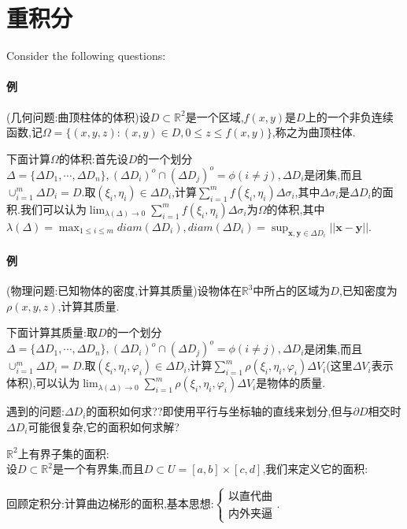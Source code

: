 \documentclass[UTF8]{ctexart}
\newcommand{\x}{\boldsymbol{x}}
\newcommand{\y}{\boldsymbol{y}}
\begin{document}
    \section{重积分}
    Consider the following questions:
    \paragraph{\colorbox{orange!75}{例}}(几何问题:曲顶柱体的体积)设$D\subset\mathbb{R}^2$是一个区域,$f(x,y)$是$D$上的一个非负连续函数,记$\Omega=\{(x,y,z):(x,y)\in D,0\le z\le f(x,y)\}$,称之为曲顶柱体.
    
    下面计算$\Omega$的体积:首先设$D$的一个划分$\Delta=\{\Delta D_1,\cdots,\Delta D_n\},(\Delta D_i)^o\cap(\Delta D_j)^o=\phi(i\not=j),\Delta D_i$是闭集,而且$\cup_{i=1}^{m}{\Delta D_i}=D$.取$(\xi_i,\eta_i)\in\Delta D_i$,计算$\sum_{i=1}^mf(\xi_i,\eta_i)\Delta\sigma_i$,其中$\Delta\sigma_i$是$\Delta D_i$的面积.我们可以认为$\lim_{\lambda(\Delta)\to 0}\sum_{i=1}^mf(\xi_i,\eta_i)\Delta\sigma_i$为$\Omega$的体积,其中$\lambda(\Delta)=\max_{1\le i\le m}diam(\Delta D_i),diam(\Delta D_i)=\sup_{\x,\y\in\Delta D_i}||\x-\y||$.

    \paragraph{\colorbox{orange!75}{例}}(物理问题:已知物体的密度,计算其质量)设物体在$\mathbb{R}^3$中所占的区域为$D$,已知密度为$\rho(x,y,z)$,计算其质量.

    下面计算其质量:取$D$的一个划分$\Delta=\{\Delta D_1,\cdots,\Delta D_n\},(\Delta D_i)^o\cap(\Delta D_j)^o=\phi(i\not=j),\Delta D_i$是闭集,而且$\cup_{i=1}^{m}{\Delta D_i}=D$.取$(\xi_i,\eta_i,\varphi_i)\in\Delta D_i$,计算$\sum_{i=1}^m\rho(\xi_i,\eta_i,\varphi_i)\Delta V_i$(这里$\Delta V_i$表示体积),可以认为$\lim_{\lambda(\Delta)\to 0}\sum_{i=1}^m\rho(\xi_i,\eta_i,\varphi_i)\Delta V_i$是物体的质量.

    遇到的问题:$\Delta D_i$的面积如何求??即使用平行与坐标轴的直线来划分,但与$\partial D$相交时$\Delta D_i$可能很复杂,它的面积如何求解?

    $\mathbb{R}^2$上有界子集的面积:\\
    设$D\subset\mathbb{R}^2$是一个有界集,而且$D\subset U=[a,b]\times[c,d]$,我们来定义它的面积:

    回顾定积分:计算曲边梯形的面积,基本思想:$\begin{cases}
        \text{以直代曲}\\
        \text{内外夹逼}
    \end{cases}$.
    
\end{document}
